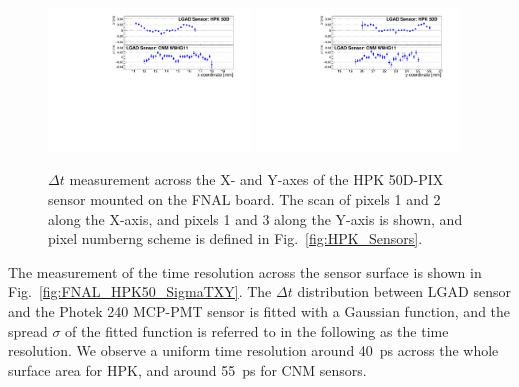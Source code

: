 \documentclass[preprint,1p]{elsarticle}
\begin{document}
\begin{figure}[htbp] 
\centering
\includegraphics[width=0.48\textwidth]{figs/HPK50DVsCNM_MeanTime_vs_X.pdf}
\includegraphics[width=0.48\textwidth]{figs/HPK50DVsCNM_MeanTime_vs_Y.pdf}
\caption{$\Delta t$ measurement across the X- and Y-axes of the HPK 50D-PIX sensor mounted on the FNAL board. The scan of pixels 1 and 2 along the X-axis, and pixels 1 and 3 along the Y-axis is shown, and pixel numberng scheme is defined in Fig.~\ref{fig:HPK_Sensors}.} 
\label{fig:FNAL_HPK50_DTXY} 
\end{figure} 

The measurement of the time resolution across the sensor surface is shown in
Fig.~\ref{fig:FNAL_HPK50_SigmaTXY}. The $\Delta t$ distribution between LGAD
sensor and the Photek 240 MCP-PMT sensor is fitted with a Gaussian function, and
the spread $\sigma$ of the fitted function is referred to in the following as
the time resolution. We observe a uniform time resolution around 40~ps across
the whole surface area for HPK, and around 55~ps for CNM sensors.
\end{document}
